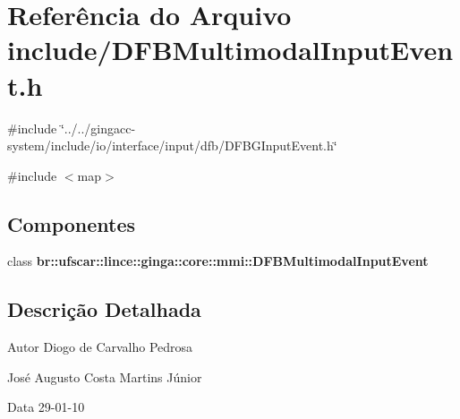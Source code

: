 \section{Referência do Arquivo include/DFBMultimodalInputEvent.h}
\label{DFBMultimodalInputEvent_8h}
{\ttfamily \#include \char`\"{}../../gingacc-\/system/include/io/interface/input/dfb/DFBGInputEvent.h\char`\"{}}\par
{\ttfamily \#include $<$map$>$}\par
\subsection*{Componentes}
\begin{DoxyCompactItemize}
\item 
class {\bf br::ufscar::lince::ginga::core::mmi::DFBMultimodalInputEvent}
\end{DoxyCompactItemize}


\subsection{Descrição Detalhada}
\begin{DoxyAuthor}{Autor}
Diogo de Carvalho Pedrosa 

José Augusto Costa Martins Júnior 
\end{DoxyAuthor}
\begin{DoxyDate}{Data}
29-\/01-\/10 
\end{DoxyDate}

